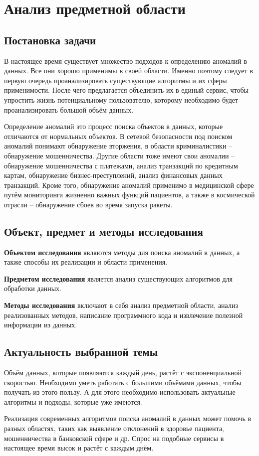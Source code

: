 \chapter{Анализ предметной области} \label{ch:ch1}

\section{Постановка задачи} \label{sec:ch1/sec1}

В настоящее время существует множество подходов к определению аномалий в данных. Все они хорошо применимы в своей области. Именно поэтому следует в первую очередь проанализировать существующие алгоритмы и их сферы применимости. После чего предлагается объединить их в единый сервис, чтобы упростить жизнь потенциальному пользователю, которому необходимо будет проанализировать большой объём данных.

Определение аномалий это процесс поиска объектов в данных, которые отличаются от нормальных объектов. В сетевой безопасности под поиском аномалий понимают обнаружение вторжения, в области криминалистики -- обнаружение мошенничества. Другие области тоже имеют свои аномалии -- обнаружение мошенничества с платежами, анализ транзакций по кредитным картам, обнаружение бизнес-преступлений, анализ финансовых данных транзакций. Кроме того, обнаружение аномалий применимо в медицинской сфере путём мониторинга жизненно важных функций пациентов, а также в космической отрасли -- обнаружение сбоев во время запуска ракеты.

\clearpage

\section{Объект, предмет и методы исследования} \label{sec:ch1/sec2}

\textbf{Объектом исследования} являются методы для поиска аномалий в данных, а также способы их реализации и области применения.

\textbf{Предметом исследования} является анализ существующих алгоритмов для обработки данных.

\textbf{Методы исследования} включают в себя анализ предметной области, анализ реализованных методов, написание программного кода и извлечение полезной информации из данных.

\clearpage

\section{Актуальность выбранной темы} \label{sec:ch1/sec3}

Объём данных, которые появляются каждый день, растёт с экспоненциальной скоростью. Необходимо уметь работать с большими объёмами данных, чтобы получать из этого пользу. А для этого необходимо использовать актуальные алгоритмы и подходы, которые уже имеются.

Реализация современных алгоритмов поиска аномалий в данных может помочь в разных областях, таких как выявление отклонений в здоровье пациента, мошенничества в банковской сфере и др. Спрос на подобные сервисы в настоящее время высок и растёт с каждым днём.

\clearpage